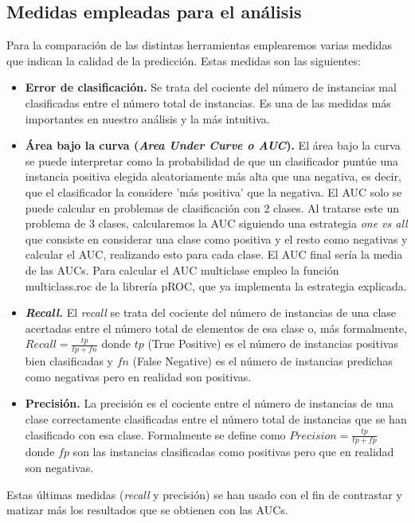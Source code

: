 \subsection{Medidas empleadas para el análisis}  \label{metricas}
Para la comparación de las distintas herramientas emplearemos varias medidas que indican la calidad de la predicción. Estas medidas son las siguientes:
\begin{itemize}
	\item \textbf{Error de clasificación.} Se trata del cociente del número de instancias mal clasificadas entre el número total de instancias. Es una de las medidas más importantes en nuestro análisis y la más intuitiva.
	\item \textbf{Área bajo la curva (\textit{Area Under Curve o AUC}).} El área bajo la curva se puede interpretar como la probabilidad de que un clasificador puntúe una instancia positiva elegida aleatoriamente más alta que una negativa, es decir, que el clasificador la considere 'más positiva' que la negativa. El AUC solo se puede calcular en problemas de clasificación con 2 clases. Al tratarse este un problema de 3 clases, calcularemos la AUC siguiendo una estrategia \textit{one vs all} que consiste en considerar una clase como positiva y el resto como negativas y calcular el AUC, realizando esto para cada clase. El AUC final sería la media de las AUCs. Para calcular el AUC multiclase empleo la función multiclass.roc de la librería pROC, que ya implementa la estrategia explicada.
	\item \textbf{\textit{Recall.}} El \textit{recall} se trata del cociente del número de instancias de una clase acertadas entre el número total de elementos de esa clase o, más formalmente, $Recall = \frac{tp}{tp+fn}$ donde $tp$ (True Positive) es el número de instancias positivas bien clasificadas y $fn$ (False Negative) es el número de instancias predichas como negativas pero en realidad son positivas.
	\item \textbf{Precisión.} La precisión es el cociente entre el número de instancias de una clase correctamente clasificadas entre el número total de instancias que se han clasificado con esa clase. Formalmente se define como $Precision = \frac{tp}{tp+fp}$ donde $fp$ son las instancias clasificadas como positivas pero que en realidad son negativas.
\end{itemize}

Estas últimas medidas (\textit{recall} y precisión) se han usado con el fin de contrastar y matizar más los resultados que se obtienen con las AUCs.

